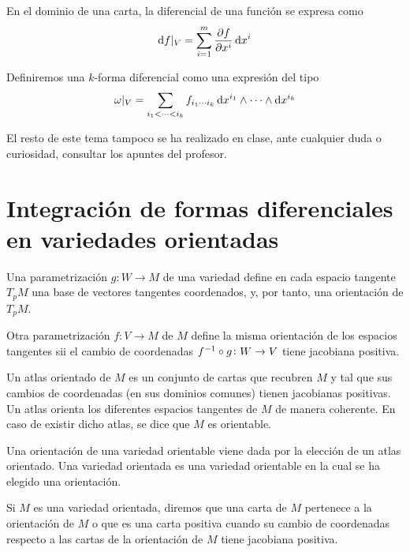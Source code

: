 \begin{prop}
    En el dominio de una carta, la diferencial de una función se expresa como
    \[
        \dif f \vert_V = \sum^m_{i= 1} \frac{\partial f}{\partial x^i} \dif x^i
    \]
\end{prop}

\begin{defi}
    Definiremos una $k$-forma diferencial como una expresión del tipo
    \[
        \omega\vert_V = \sum_{i_1 < \cdots < i_k} f_{i_1 \cdots i_k} \dif x^{i_1} \wedge \cdots \wedge \dif x^{i_k}
    \]
\end{defi}

El resto de este tema tampoco se ha realizado en clase, ante cualquier duda o curiosidad, consultar los apuntes del profesor.

\section{Integración de formas diferenciales en variedades orientadas}

\begin{defi}
    Una parametrización $g \colon W \to M$ de una variedad define en cada espacio tangente $T_pM$ una base de vectores tangentes
    coordenados, y, por tanto, una orientación de $T_pM$.

    Otra parametrización $f \colon V \to M$ de $M$ define la misma orientación de los espacios tangentes sii el cambio de coordenadas
    $f^{-1} \circ g \colon W \to V$ tiene jacobiana positiva.
\end{defi}

\begin{defi}
    Un atlas orientado de $M$ es un conjunto de cartas que recubren $M$ y tal que sus cambios de coordenadas (en sus dominios comunes)
    tienen jacobianas positivas. Un atlas orienta los diferentes espacios tangentes de $M$ de manera coherente. En caso de existir dicho atlas,
    se dice que $M$ es orientable.
\end{defi}

\begin{defi}
    Una orientación de una variedad orientable viene dada por la elección de un atlas orientado. Una variedad orientada es una variedad
    orientable en la cual se ha elegido una orientación.
\end{defi}

\begin{defi}
    Si $M$ es una variedad orientada, diremos que una carta de $M$ pertenece a la orientación de $M$ o que es una carta positiva cuando su
    cambio de coordenadas respecto a las cartas de la orientación de $M$ tiene jacobiana positiva.
\end{defi}

